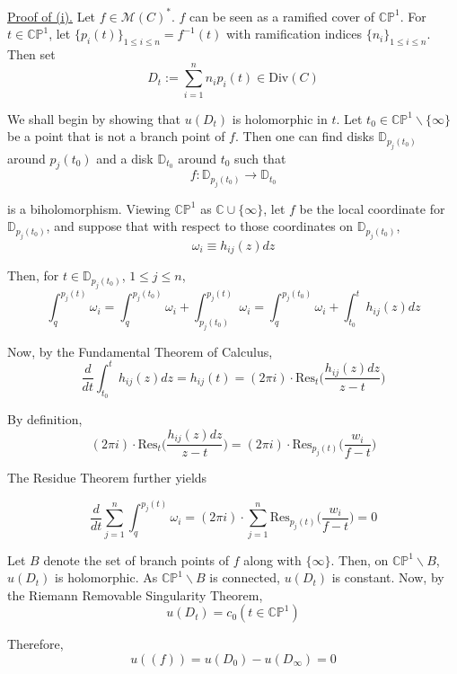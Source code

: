 \documentclass[11pt,a4paper]{article}
\begin{document}
\underline{Proof of (i).} Let $f \in \mathcal{M}(C)^*$. $f$ can be seen as a ramified cover of $\mathbb{CP}^1$. For $t\in \mathbb{CP}^1$, let $\{p_i(t)\}_{1\leq i\leq n} = f^{-1}(t)$ with ramification indices $\{n_i\}_{1\leq i\leq n}$. Then set $$D_t:= \sum_{i=1}^{n}{n_ip_i(t)} \in \text{Div}(C)$$

We shall begin by showing that $u(D_t)$ is holomorphic in $t$. Let $t_0\in \mathbb{CP}^1\backslash \{\infty\}$ be a point that is not a branch point of $f$. Then one can find disks $\mathbb{D}_{p_j(t_0)}$ around $p_j(t_0)$ and a disk $\mathbb{D}_{t_0}$ around $t_0$ such that
$$f:\mathbb{D}_{p_j(t_0)}\rightarrow \mathbb{D}_{t_0}$$

is a biholomorphism. Viewing $\mathbb{CP}^1$ as $\mathbb{C} \cup \{\infty\}$, let $f$ be the local coordinate for $\mathbb{D}_{p_j(t_0)}$, and suppose that with respect to those coordinates on $\mathbb{D}_{p_j(t_0)}$,
$$\omega_i \equiv h_{ij}(z)dz$$

Then, for $t \in \mathbb{D}_{p_j(t_0)}$, $1\leq j\leq n$,
$$\int_{q}^{p_j(t)}\omega_i = \int_{q}^{p_j(t_0)}\omega_i + \int_{p_j(t_0)}^{p_j(t)}\omega_i = \int_{q}^{p_j(t_0)}\omega_i + \int_{t_0}^{t}h_{ij}(z)dz$$

Now, by the Fundamental Theorem of Calculus,
$$\frac{d}{dt}\int_{t_0}^{t}h_{ij}(z)dz = h_{ij}(t) = (2\pi i)\cdot\text{Res}_t\bigg(\frac{h_{ij}(z)dz}{z-t}\bigg)$$

By definition,
$$(2\pi i)\cdot\text{Res}_t\bigg(\frac{h_{ij}(z)dz}{z-t}\bigg) = (2\pi i)\cdot\text{Res}_{p_j(t)}\bigg(\frac{w_i}{f-t}\bigg)$$

The Residue Theorem further yields

$$\frac{d}{dt}\sum_{j=1}^{n}{\int_{q}^{p_j(t)}\omega_i} = (2\pi i)\cdot \sum_{j=1}^{n}{\text{Res}_{p_j(t)}\bigg(\frac{w_i}{f-t}\bigg)} = 0$$

Let $B$ denote the set of branch points of $f$ along with $\{\infty\}$. Then, on $\mathbb{CP}^1\backslash B$, $u(D_t)$ is holomorphic. As $\mathbb{CP}^1\backslash B$ is connected, $u(D_t)$ is constant. Now, by the Riemann Removable Singularity Theorem,
$$u(D_t) = c_0   (t \in \mathbb{CP}^1)$$

Therefore,
$$u((f)) = u(D_0) - u(D_{\infty}) = 0$$
\end{document}
